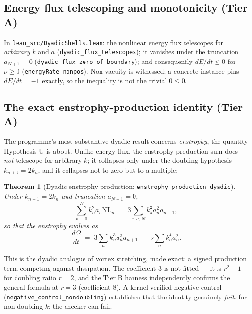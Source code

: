 \documentclass[11pt,a4paper]{article}
\newcommand{\tA}{\textcolor{TierA}{\textbf{Tier A}}}
\theoremstyle{definition}
\theoremstyle{plain}
\newtheorem{theorem}{Theorem}[section]
\begin{document}
\subsection{Energy flux telescoping and monotonicity (\tA{})}

In \texttt{lean\_src/DyadicShells.lean}: the nonlinear energy flux telescopes for
\emph{arbitrary} $k$ and $a$ (\texttt{dyadic\_flux\_\allowbreak telescopes}); it vanishes under
the truncation $a_{N+1}=0$ (\texttt{dyadic\_flux\_\allowbreak zero\_of\_\allowbreak boundary});
and consequently $dE/dt\le0$ for $\nu\ge0$ (\texttt{energyRate\_\allowbreak nonpos}). Non-vacuity is witnessed: a concrete
instance pins $dE/dt=-1$ exactly, so the inequality is not the trivial $0\le0$.

\subsection{The exact enstrophy-production identity (\tA{})}

The programme's most substantive dyadic result concerns \emph{enstrophy}, the quantity
Hypothesis U is about. Unlike energy flux, the enstrophy production sum does \emph{not}
telescope for arbitrary $k$; it collapses only under the doubling hypothesis
$k_{n+1}=2k_n$, and it collapses not to zero but to a multiple:

\begin{theorem}[Dyadic enstrophy production; \texttt{enstrophy\_production\_dyadic}]
Under $k_{n+1}=2k_n$ and truncation $a_{N+1}=0$,
\begin{equation}
\sum_{n=0}^{N} k_n^2 a_n \mathrm{NL}_n \;=\; 3\sum_{n<N} k_n^3a_n^2a_{n+1},
\end{equation}
so that the enstrophy evolves as
\begin{equation}
\frac{d\Omega}{dt} \;=\; 3\sum_{n} k_n^3a_n^2a_{n+1} \;-\; \nu\sum_n k_n^4a_n^2 .
\label{eq:production}
\end{equation}
\end{theorem}

This is the dyadic analogue of vortex stretching, made exact: a signed production term
competing against dissipation. The coefficient $3$ is not fitted --- it is $r^2-1$ for
doubling ratio $r=2$, and the Tier B harness independently confirms the general formula at
$r=3$ (coefficient $8$). A kernel-verified negative control
(\texttt{negative\_control\_nondoubling}) establishes that the identity genuinely \emph{fails}
for non-doubling $k$; the checker can fail.
\end{document}
